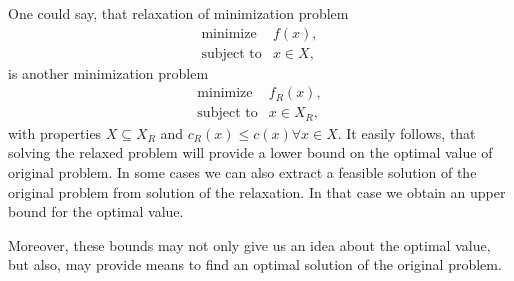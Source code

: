 \documentclass[10pt,oneside]{book}
\theoremstyle{definition}
\begin{document}
One could say, that relaxation of minimization problem 
\begin{equation}
\begin{array}{ll}
\mbox{minimize} & f(x), \\
\mbox{subject to} & x\in X,
\end{array}
\end{equation}
is another minimization problem  
\begin{equation}
\begin{array}{ll}
\mbox{minimize} & f_R(x), \\
\mbox{subject to} & x\in X_R,
\end{array}
\end{equation}
with properties $X\subseteq X_R$ and $c_R(x)\leq c(x) \forall x\in X$.
It easily follows, that solving the relaxed problem will provide a lower bound on the optimal value of original problem. In some cases we can also extract a feasible solution of the original problem from solution of the relaxation. In that case we obtain an upper bound for the optimal value. 

Moreover, these bounds may not only give us an idea about the optimal value, but also, may provide means to find an optimal solution of the original problem. 
\end{document}
